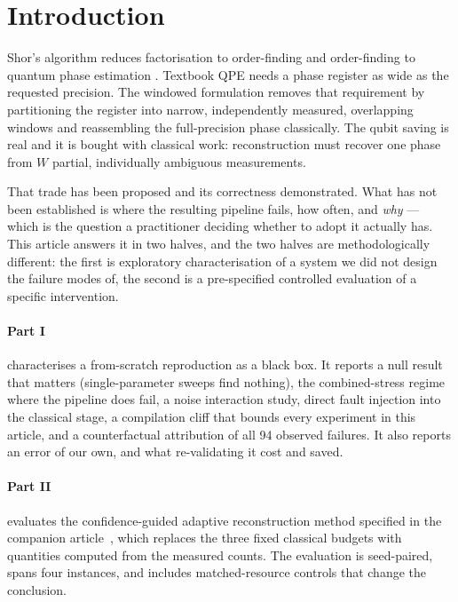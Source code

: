 \section{Introduction}
\label{sec:intro}

Shor's algorithm \cite{shor1997} reduces factorisation to order-finding and
order-finding to quantum phase estimation
\cite{kitaev1995,cleve1998,nielsenchuang}. Textbook QPE needs a phase
register as wide as the requested precision. The windowed formulation
\cite{wqpe2025,modularshor2025} removes that requirement by partitioning the
register into narrow, independently measured, overlapping windows and
reassembling the full-precision phase classically. The qubit saving is real
and it is bought with classical work: reconstruction must recover one phase
from $W$ partial, individually ambiguous measurements.

That trade has been proposed and its correctness demonstrated. What has not
been established is where the resulting pipeline fails, how often, and
\emph{why} --- which is the question a practitioner deciding whether to
adopt it actually has. This article answers it in two halves, and the two
halves are methodologically different: the first is exploratory
characterisation of a system we did not design the failure modes of, the
second is a pre-specified controlled evaluation of a specific intervention.

\paragraph{Part I} characterises a from-scratch reproduction as a black box.
It reports a null result that matters (single-parameter sweeps find nothing),
the combined-stress regime where the pipeline does fail, a noise interaction
study, direct fault injection into the classical stage, a compilation cliff
that bounds every experiment in this article, and a counterfactual
attribution of all 94 observed failures. It also reports an error of our
own, and what re-validating it cost and saved.

\paragraph{Part II} evaluates the confidence-guided adaptive reconstruction
method specified in the companion article~\cite{methodpaper}, which replaces
the three fixed classical budgets with quantities computed from the measured
counts. The evaluation is seed-paired, spans four instances, and includes
matched-resource controls that change the conclusion.

